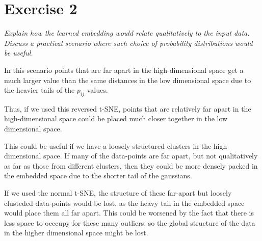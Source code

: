 \section*{Exercise 2}

\textit{
Explain how the learned embedding would relate qualitatively to the input data. Discuss a practical scenario where such choice of probability distributions would be useful.}

In this scenario points that are far apart in the high-dimensional space get a much larger value than the same distances in the low dimensional space due to the heavier tails of the $p_{ij}$ values.

Thus, if we used this reversed t-SNE, points that are relatively far apart in the high-dimensional space could be placed much closer together in the low dimensional space. 

This could be useful if we have a loosely structured clusters in the high-dimensional space.
If many of the data-points are far apart, but not qualitatively as far as those from different clusters, then they could be more densely packed in the embedded space due to the shorter tail of the gaussians. 

If we used the normal t-SNE, the structure of these far-apart but loosely clusteded data-points would be lost, as the heavy tail in the embedded space would place them all far apart. This could be worsened by the fact that there is less space to occcupy for these many outliers, so the global structure of the data in the higher dimensional space might be lost. 
